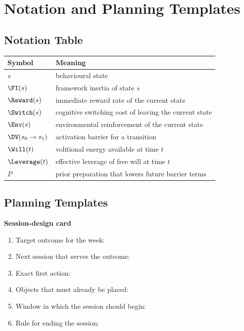 \chapter{Notation and Planning Templates}
\label{app:notation}

\section{Notation Table}

\begin{center}
\begin{tabularx}{\textwidth}{@{}l X@{}}
\toprule
Symbol & Meaning \\
\midrule
$s$ & behavioural state \\
$\FI(s)$ & framework inertia of state $s$ \\
$\Reward(s)$ & immediate reward rate of the current state \\
$\Switch(s)$ & cognitive switching cost of leaving the current state \\
$\Env(s)$ & environmental reinforcement of the current state \\
$\DV(s_0 \to s_1)$ & activation barrier for a transition \\
$\Will(t)$ & volitional energy available at time $t$ \\
$\Leverage(t)$ & effective leverage of free will at time $t$ \\
$P$ & prior preparation that lowers future barrier terms \\
\bottomrule
\end{tabularx}
\end{center}

\section{Planning Templates}

\begin{templatebox}
\textbf{Session-design card}
\begin{enumerate}[nosep]
  \item Target outcome for the week:
  \item Next session that serves the outcome:
  \item Exact first action:
  \item Objects that must already be placed:
  \item Window in which the session should begin:
  \item Rule for ending the session:
\end{enumerate}
\end{templatebox}

